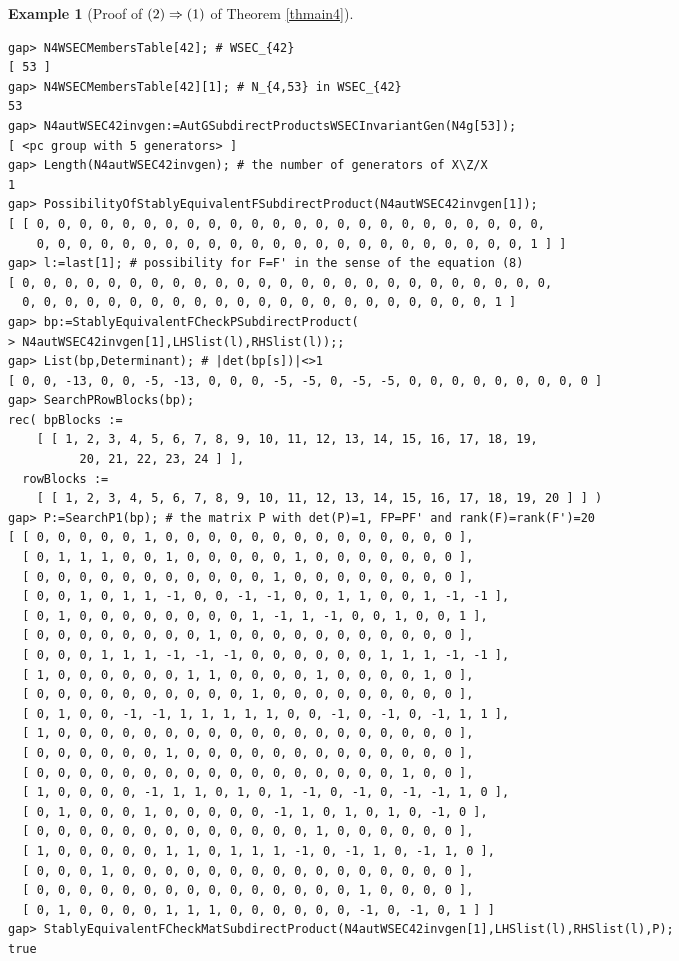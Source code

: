 \documentclass{amsart}
\theoremstyle{plain}
\theoremstyle{definition}
\newtheorem{example}[theorem]{Example}
\theoremstyle{remark}
\begin{document}
\begin{example}[Proof of ${\rm (2)}\Rightarrow {\rm (1)}$ of {Theorem \ref{thmain4}}]
\begin{verbatim}
gap> N4WSECMembersTable[42]; # WSEC_{42}
[ 53 ]
gap> N4WSECMembersTable[42][1]; # N_{4,53} in WSEC_{42}
53
gap> N4autWSEC42invgen:=AutGSubdirectProductsWSECInvariantGen(N4g[53]);
[ <pc group with 5 generators> ]
gap> Length(N4autWSEC42invgen); # the number of generators of X\Z/X
1
gap> PossibilityOfStablyEquivalentFSubdirectProduct(N4autWSEC42invgen[1]);
[ [ 0, 0, 0, 0, 0, 0, 0, 0, 0, 0, 0, 0, 0, 0, 0, 0, 0, 0, 0, 0, 0, 0, 0, 0, 
    0, 0, 0, 0, 0, 0, 0, 0, 0, 0, 0, 0, 0, 0, 0, 0, 0, 0, 0, 0, 0, 0, 0, 1 ] ]
gap> l:=last[1]; # possibility for F=F' in the sense of the equation (8)
[ 0, 0, 0, 0, 0, 0, 0, 0, 0, 0, 0, 0, 0, 0, 0, 0, 0, 0, 0, 0, 0, 0, 0, 0, 0, 
  0, 0, 0, 0, 0, 0, 0, 0, 0, 0, 0, 0, 0, 0, 0, 0, 0, 0, 0, 0, 0, 0, 1 ]
gap> bp:=StablyEquivalentFCheckPSubdirectProduct(
> N4autWSEC42invgen[1],LHSlist(l),RHSlist(l));;
gap> List(bp,Determinant); # |det(bp[s])|<>1
[ 0, 0, -13, 0, 0, -5, -13, 0, 0, 0, -5, -5, 0, -5, -5, 0, 0, 0, 0, 0, 0, 0, 0, 0 ]
gap> SearchPRowBlocks(bp);
rec( bpBlocks := 
    [ [ 1, 2, 3, 4, 5, 6, 7, 8, 9, 10, 11, 12, 13, 14, 15, 16, 17, 18, 19, 
          20, 21, 22, 23, 24 ] ], 
  rowBlocks := 
    [ [ 1, 2, 3, 4, 5, 6, 7, 8, 9, 10, 11, 12, 13, 14, 15, 16, 17, 18, 19, 20 ] ] )
gap> P:=SearchP1(bp); # the matrix P with det(P)=1, FP=PF' and rank(F)=rank(F')=20
[ [ 0, 0, 0, 0, 0, 1, 0, 0, 0, 0, 0, 0, 0, 0, 0, 0, 0, 0, 0, 0 ], 
  [ 0, 1, 1, 1, 0, 0, 1, 0, 0, 0, 0, 0, 1, 0, 0, 0, 0, 0, 0, 0 ], 
  [ 0, 0, 0, 0, 0, 0, 0, 0, 0, 0, 0, 1, 0, 0, 0, 0, 0, 0, 0, 0 ], 
  [ 0, 0, 1, 0, 1, 1, -1, 0, 0, -1, -1, 0, 0, 1, 1, 0, 0, 1, -1, -1 ], 
  [ 0, 1, 0, 0, 0, 0, 0, 0, 0, 0, 1, -1, 1, -1, 0, 0, 1, 0, 0, 1 ], 
  [ 0, 0, 0, 0, 0, 0, 0, 0, 1, 0, 0, 0, 0, 0, 0, 0, 0, 0, 0, 0 ], 
  [ 0, 0, 0, 1, 1, 1, -1, -1, -1, 0, 0, 0, 0, 0, 0, 1, 1, 1, -1, -1 ], 
  [ 1, 0, 0, 0, 0, 0, 0, 1, 1, 0, 0, 0, 0, 1, 0, 0, 0, 0, 1, 0 ], 
  [ 0, 0, 0, 0, 0, 0, 0, 0, 0, 0, 1, 0, 0, 0, 0, 0, 0, 0, 0, 0 ], 
  [ 0, 1, 0, 0, -1, -1, 1, 1, 1, 1, 1, 0, 0, -1, 0, -1, 0, -1, 1, 1 ], 
  [ 1, 0, 0, 0, 0, 0, 0, 0, 0, 0, 0, 0, 0, 0, 0, 0, 0, 0, 0, 0 ], 
  [ 0, 0, 0, 0, 0, 0, 1, 0, 0, 0, 0, 0, 0, 0, 0, 0, 0, 0, 0, 0 ], 
  [ 0, 0, 0, 0, 0, 0, 0, 0, 0, 0, 0, 0, 0, 0, 0, 0, 0, 1, 0, 0 ], 
  [ 1, 0, 0, 0, 0, -1, 1, 1, 0, 1, 0, 1, -1, 0, -1, 0, -1, -1, 1, 0 ], 
  [ 0, 1, 0, 0, 0, 1, 0, 0, 0, 0, 0, -1, 1, 0, 1, 0, 1, 0, -1, 0 ], 
  [ 0, 0, 0, 0, 0, 0, 0, 0, 0, 0, 0, 0, 0, 1, 0, 0, 0, 0, 0, 0 ], 
  [ 1, 0, 0, 0, 0, 0, 1, 1, 0, 1, 1, 1, -1, 0, -1, 1, 0, -1, 1, 0 ], 
  [ 0, 0, 0, 1, 0, 0, 0, 0, 0, 0, 0, 0, 0, 0, 0, 0, 0, 0, 0, 0 ], 
  [ 0, 0, 0, 0, 0, 0, 0, 0, 0, 0, 0, 0, 0, 0, 0, 1, 0, 0, 0, 0 ], 
  [ 0, 1, 0, 0, 0, 0, 1, 1, 1, 0, 0, 0, 0, 0, 0, -1, 0, -1, 0, 1 ] ]
gap> StablyEquivalentFCheckMatSubdirectProduct(N4autWSEC42invgen[1],LHSlist(l),RHSlist(l),P);
true


\end{verbatim}
\end{example}
\end{document}
